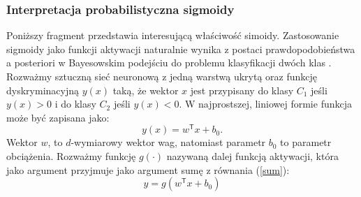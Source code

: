 \documentclass[11pt]{book}
\theoremstyle{definition}
\begin{document}
%
\subsubsection{Interpretacja probabilistyczna sigmoidy}
%
Poniższy fragment przedstawia interesującą właściwość simoidy. Zastosowanie sigmoidy jako funkcji aktywacji naturalnie wynika z postaci prawdopodobieństwa a posteriori w Bayesowskim podejściu do problemu klasyfikacji dwóch klas \cite{Bishop:2006:PRML}.
%
Rozważmy sztuczną sieć neuronową z jedną warstwą ukrytą oraz funkcję dyskryminacyjną $y(x)$ taką, że wektor $x$ jest przypisany do klasy $C_1$ jeśli $y(x) > 0$ i do klasy $C_2$ jeśli $y(x) < 0$. W najprostszej, liniowej formie funkcja może być zapisana jako:
%
\begin{equation}
y(x) = w^\mathsf{T} x + b_0.
\label{sum}
\end{equation}
%
Wektor $w$, to $d$-wymiarowy wektor wag, natomiast parametr $b_0$ to parametr obciążenia.
%
Rozważmy funkcję $g(\cdot)$ nazywaną dalej funkcją aktywacji, która jako argument przyjmuje jako argument sumę z równania (\ref{sum}):
%
\begin{equation}
y = g\left(w^\mathsf{T} x + b_0 \right)
\label{suma}
\end{equation}
%
\def\layersep{2.5cm}
\end{document}

